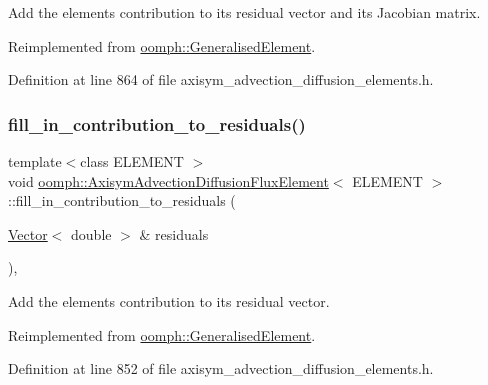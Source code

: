 Add the element\textquotesingle{}s contribution to its residual vector and its Jacobian matrix. 



Reimplemented from \hyperlink{classoomph_1_1GeneralisedElement_a6ae09fc0d68e4309ac1b03583d252845}{oomph\+::\+Generalised\+Element}.



Definition at line 864 of file axisym\+\_\+advection\+\_\+diffusion\+\_\+elements.\+h.

\mbox{\label{classoomph_1_1AxisymAdvectionDiffusionFluxElement_a2264f12223ccbcc2f4e3f89403fddea4}} 
\subsubsection{\texorpdfstring{fill\+\_\+in\+\_\+contribution\+\_\+to\+\_\+residuals()}{fill\_in\_contribution\_to\_residuals()}}
{\footnotesize\ttfamily template$<$class E\+L\+E\+M\+E\+NT $>$ \\
void \hyperlink{classoomph_1_1AxisymAdvectionDiffusionFluxElement}{oomph\+::\+Axisym\+Advection\+Diffusion\+Flux\+Element}$<$ E\+L\+E\+M\+E\+NT $>$\+::fill\+\_\+in\+\_\+contribution\+\_\+to\+\_\+residuals (\begin{DoxyParamCaption}\item[{\hyperlink{classoomph_1_1Vector}{Vector}$<$ double $>$ \&}]{residuals }\end{DoxyParamCaption})\hspace{0.3cm}{\ttfamily [inline]}, {\ttfamily [virtual]}}



Add the element\textquotesingle{}s contribution to its residual vector. 



Reimplemented from \hyperlink{classoomph_1_1GeneralisedElement_a310c97f515e8504a48179c0e72c550d7}{oomph\+::\+Generalised\+Element}.



Definition at line 852 of file axisym\+\_\+advection\+\_\+diffusion\+\_\+elements.\+h.




